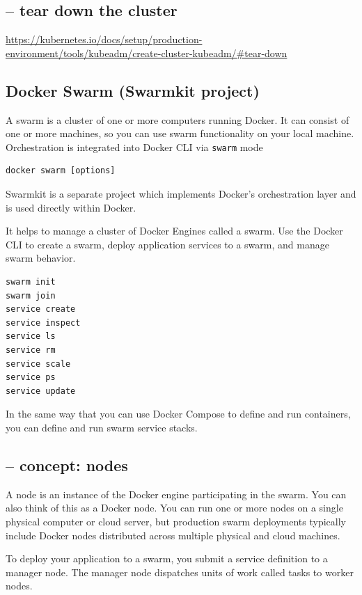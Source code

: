 \subsection{-- tear down the cluster}

\url{https://kubernetes.io/docs/setup/production-environment/tools/kubeadm/create-cluster-kubeadm/#tear-down}


\subsection{Docker Swarm (Swarmkit project)}
\label{sec:Docker-swarm}


A swarm is a cluster of one or more computers running Docker. It can consist of
one or more machines, so you can use swarm functionality on your local machine.
Orchestration is integrated into Docker CLI via \verb!swarm! mode
\begin{verbatim}
docker swarm [options]
\end{verbatim}

\begin{mdframed}

Swarmkit is a separate project which implements Docker’s orchestration layer and is used directly within Docker.


\end{mdframed}
It helps to manage a cluster of Docker Engines called a swarm.
Use the Docker CLI to create a swarm, deploy application services to a swarm,
and manage swarm behavior.
\begin{verbatim}
swarm init
swarm join
service create
service inspect
service ls
service rm
service scale
service ps
service update
\end{verbatim}


In the same way that you can use Docker Compose to define and run containers, you can define and run swarm service stacks.

\subsection{-- concept: nodes}


A node is an instance of the Docker engine participating in the swarm. You can
also think of this as a Docker node. You can run one or more nodes on a single
physical computer or cloud server, but production swarm deployments typically
include Docker nodes distributed across multiple physical and cloud machines.


To deploy your application to a swarm, you submit a service definition to a
manager node. The manager node dispatches units of work called tasks to worker
nodes.

